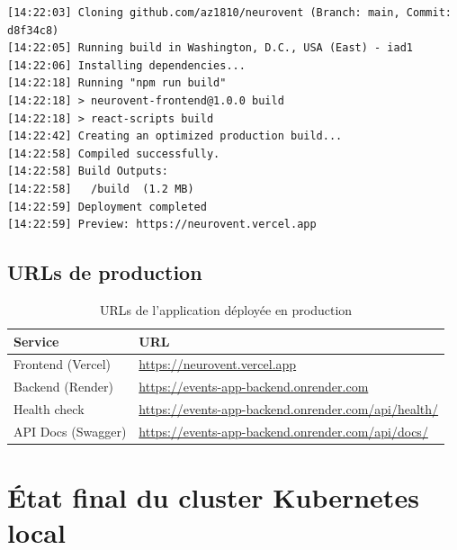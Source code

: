 \documentclass[12pt,a4paper]{article}
\begin{document}
\begin{lstlisting}[style=terminal, caption={Déploiement Vercel — logs de build}]
[14:22:03] Cloning github.com/az1810/neurovent (Branch: main, Commit: d8f34c8)
[14:22:05] Running build in Washington, D.C., USA (East) - iad1
[14:22:06] Installing dependencies...
[14:22:18] Running "npm run build"
[14:22:18] > neurovent-frontend@1.0.0 build
[14:22:18] > react-scripts build
[14:22:42] Creating an optimized production build...
[14:22:58] Compiled successfully.
[14:22:58] Build Outputs:
[14:22:58]   /build  (1.2 MB)
[14:22:59] Deployment completed
[14:22:59] Preview: https://neurovent.vercel.app
\end{lstlisting}

\subsection{URLs de production}

\begin{table}[H]
  \centering
  \begin{tabularx}{\textwidth}{lX}
    \toprule
    \textbf{Service} & \textbf{URL} \\
    \midrule
    Frontend (Vercel)    & \url{https://neurovent.vercel.app} \\
    Backend (Render)     & \url{https://events-app-backend.onrender.com} \\
    Health check         & \url{https://events-app-backend.onrender.com/api/health/} \\
    API Docs (Swagger)   & \url{https://events-app-backend.onrender.com/api/docs/} \\
    \bottomrule
  \end{tabularx}
  \caption{URLs de l'application déployée en production}
\end{table}

\section{État final du cluster Kubernetes local}
\end{document}
